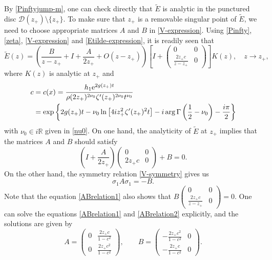 \documentclass[11pt,a4paper]{article}
\numberwithin{equation}{section}
\def\arg {\mathop{\rm arg}\nolimits}
\begin{document}
By \eqref{Pinftyjump-m}, one can check directly that $\widetilde{E}$ is analytic in the punctured disc $\mathcal{D}(z_{+})\setminus\{z_+\}$.
To make sure that $z_+$ is a removable singular point of $\widetilde{E}$, we need to choose appropriate matrices $A$ and $B$ in \eqref{V-expression}. Using \eqref{Pinfty}, \eqref{zeta}, \eqref{V-expression} and \eqref{Etilde-expression}, it is readily seen that
\begin{equation}\label{Etilde-expansion}
\widetilde{E}(z)=\left(\frac{B}{z-z_+}+I+\frac{A}{2z_+}+O(z-z_+)\right)\left[I+
\begin{pmatrix} 0 & 0 \\ \frac{2z_+c}{z-z_+} & 0\end{pmatrix}\right]K(z),\quad z \to z_+,
\end{equation}
where $K(z)$ is analytic at $z_+$ and
\begin{align}\label{c}
c&=c(x)=\frac{h_1\mathrm{e}^{2g(z_+)t}}
{\rho(2z_+)^{2\nu_0}\zeta'(z_+)^{2\nu_0}t^{\nu_0}}\nonumber\\
&=\exp\left\{2g(z_+)t-\nu_0\ln\left[4iz_+^2\zeta'(z_+)^2t\right]
-i\arg\Gamma\left(\frac{1}{2}-\nu_0\right)-\frac{i\pi}{2}\right\}
\end{align}
with $\nu_0\in i\mathbb{R}$ given in \eqref{nu0}. On one hand, the analyticity of $\widetilde{E}$ at $z_+$ implies that the matrices ${A}$ and ${B}$ should satisfy
\begin{equation}\label{ABrelation1}
\left(I+\frac{A}{2z_+}\right)\begin{pmatrix} 0 & 0 \\ 2z_+c & 0\end{pmatrix}+B=0.
\end{equation}
On the other hand, the symmetry relation \eqref{V-symmetry} gives us
\begin{equation}\label{ABrelation2}
\sigma_1A\sigma_1=-B.
\end{equation}
Note that the equation \eqref{ABrelation1} also shows that $B \begin{pmatrix} 0 & 0 \\ \frac{2z_+c}{z-z_+} & 0\end{pmatrix}=0$. One can solve the equations \eqref{ABrelation1} and \eqref{ABrelation2} explicitly, and the solutions are given by
\begin{equation}\label{ABexpression}
{A}=\begin{pmatrix} 0 & \frac{2z_+c}{1-c^2}\\[.1cm]     0 & \frac{2z_+c^2}{1-c^2} \end{pmatrix},\qquad
{B}=\begin{pmatrix} -\frac{2z_+c^2}{1-c^2} & 0\\[.1cm]  -\frac{2z_+c}{1-c^2} & 0 \end{pmatrix}.
\end{equation}
\end{document}
